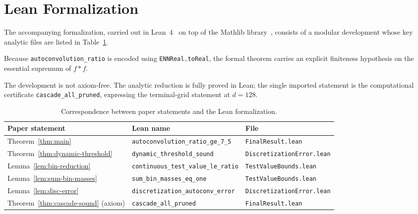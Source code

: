\documentclass[11pt, letterpaper]{article}
\theoremstyle{paperplain}
\theoremstyle{paperdef}
\begin{document}
\section{Lean Formalization}\label{sec:formalization}

The accompanying formalization, carried out in
Lean~4~\cite{Lean4} on top of the Mathlib library~\cite{Mathlib},
consists of a modular development whose key analytic files are listed
in Table~\ref{tab:lean-map}.

Because \texttt{autoconvolution\_ratio} is encoded using
\texttt{ENNReal.toReal}, the formal theorem carries an explicit
finiteness hypothesis on the essential supremum of $f*f$.

The development is not axiom-free.  The analytic reduction is fully
proved in Lean; the single imported statement is the computational
certificate \texttt{cascade\_all\_pruned}, expressing the terminal-grid
statement at $d=128$.

\begin{table}[h]
\centering\small
\begin{tabular}{lll}
  \toprule
  \textbf{Paper statement} & \textbf{Lean name} & \textbf{File} \\
  \midrule
  Theorem~\ref{thm:main} & \texttt{autoconvolution\_ratio\_ge\_7\_5}
    & \texttt{FinalResult.lean} \\
  Theorem~\ref{thm:dynamic-threshold} & \texttt{dynamic\_threshold\_sound}
    & \texttt{DiscretizationError.lean} \\
  Lemma~\ref{lem:bin-reduction} & \texttt{continuous\_test\_value\_le\_ratio}
    & \texttt{TestValueBounds.lean} \\
  Lemma~\ref{lem:sum-bin-masses} & \texttt{sum\_bin\_masses\_eq\_one}
    & \texttt{TestValueBounds.lean} \\
  Lemma~\ref{lem:disc-error} & \texttt{discretization\_autoconv\_error}
    & \texttt{DiscretizationError.lean} \\
  Theorem~\ref{thm:cascade-sound} (axiom) & \texttt{cascade\_all\_pruned}
    & \texttt{FinalResult.lean} \\
  \bottomrule
\end{tabular}
\caption{Correspondence between paper statements and the Lean formalization.}
\label{tab:lean-map}
\end{table}


\end{document}
